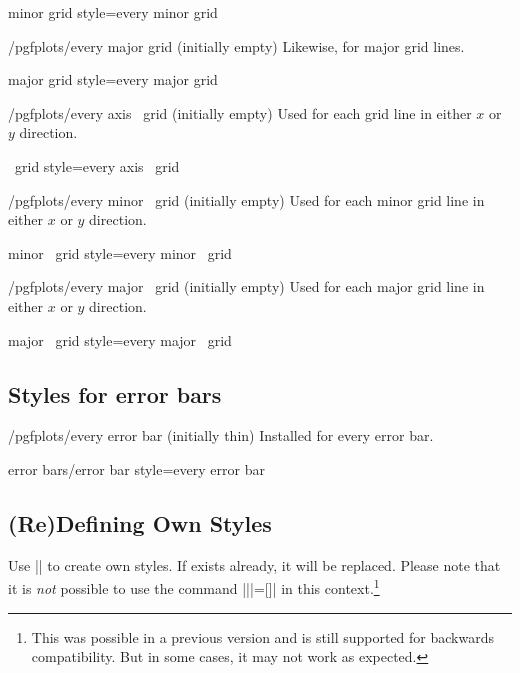 \pgfplotsshortstylekey minor grid style=every minor grid\pgfeov

\begin{stylekey}{/pgfplots/every major grid (initially empty)}
    Likewise, for major grid lines.
\end{stylekey}

\pgfplotsshortstylekey major grid style=every major grid\pgfeov

\begin{xystylekey}{/pgfplots/every axis \x\ grid (initially empty)}
    Used for each grid line in either $x$ or $y$ direction.
\end{xystylekey}

\pgfplotsshortxystylekey \x\ grid style=every axis \x\ grid\pgfeov

\begin{xystylekey}{/pgfplots/every minor \x\ grid (initially empty)}
    Used for each minor grid line in either $x$ or $y$ direction.
\end{xystylekey}

\pgfplotsshortxystylekey minor \x\ grid style=every minor \x\ grid\pgfeov

\begin{xystylekey}{/pgfplots/every major \x\ grid (initially empty)}
    Used for each major grid line in either $x$ or $y$ direction.
\end{xystylekey}

\pgfplotsshortxystylekey major \x\ grid style=every major \x\ grid\pgfeov


\subsection*{Styles for error bars}

\begin{stylekey}{/pgfplots/every error bar (initially thin)}
    Installed for every error bar.
\end{stylekey}

\pgfplotsshortstylekey error bars/error bar style=every error bar\pgfeov


\subsection{(Re)Defining Own Styles}
\label{sec:styles:own}

Use || to
create own styles. If  exists already, it will be replaced.
Please note that it is \emph{not} possible to use the \Tikz{} command
|\tikzstyle||=[]| in this context.\footnote{This was possible
in a previous version and is still supported for backwards compatibility. But
in some cases, it may not work as expected.}
%
\begin{codeexample}[]
\end{codeexample}
